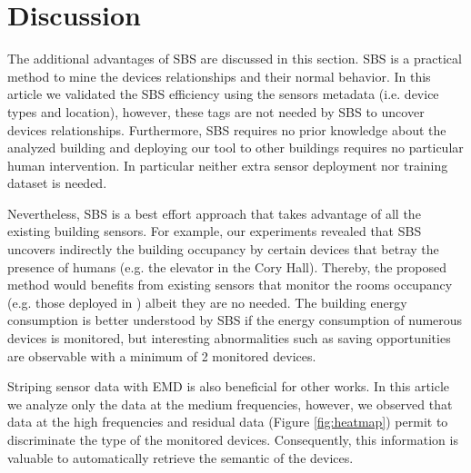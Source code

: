 \section{Discussion}
The additional advantages of SBS are discussed in this section.
SBS is a practical method to mine the devices relationships and their normal behavior. 
In this article we validated the SBS efficiency using the sensors metadata (i.e. device types and location), however, these tags are not needed by SBS to uncover devices relationships.
Furthermore, SBS requires no prior knowledge about the analyzed building and deploying our tool to other buildings requires no particular human intervention.
In particular neither extra sensor deployment nor training dataset is needed. 

Nevertheless, SBS is a best effort approach that takes advantage of all the existing building sensors.
For example, our experiments revealed that SBS uncovers indirectly the building occupancy by certain devices that betray the presence of humans (e.g. the elevator in the Cory Hall). 
Thereby, the proposed method would benefits from existing sensors that monitor the rooms occupancy (e.g. those deployed in \cite{agarwal:ipsn2011,erickson:ipsn2011}) albeit they are no needed.
The building energy consumption is better understood by SBS if the energy consumption of numerous devices is monitored, 
but interesting abnormalities such as saving opportunities are observable with a minimum of 2 monitored devices.


Striping sensor data with EMD is also beneficial for other works.
In this article we analyze only the data at the medium frequencies, however, we observed that data at the high frequencies and residual data (Figure \ref{fig:heatmap}) permit to discriminate the type of the monitored devices.
Consequently, this information is valuable to automatically retrieve the semantic of the devices.


% 
% 
